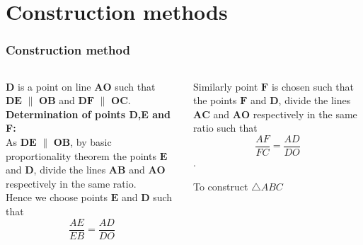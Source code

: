 \documentclass{beamer}
\renewcommand{\vec}[1]{\mathbf{#1}}
\begin{document}
\section*{Construction methods}
\begin{frame}[fragile]
\footnotesize
\frametitle{Construction method}
\begin{columns}
\begin{column}{0.5\textwidth}
    
    $\vec{D}$ is a point on line $\vec{AO}$ such that \\$\vec{DE}$ $\parallel$ $\vec{OB}$ \quad and \quad $\vec{DF}$  $\parallel$  $\vec{OC}$.\\

\textbf{Determination of points D,E and F:}\\

As $\vec{DE}$ $\parallel$ $\vec{OB}$, by basic proportionality theorem the points $\vec{E}$ and $\vec{D}$, divide the lines $\vec{AB}$ and $\vec{AO}$ respectively in the same ratio.\\ 
Hence we choose points $\vec{E}$ and $\vec{D}$ such that \begin{equation}\frac{AE}{EB} = \frac{AD}{DO}\end{equation} 

  \end{column}
 
 
\begin{column}{0.5\textwidth}   
\quad Similarly point $\vec{F}$ is chosen such that the points $\vec{F}$ and $\vec{D}$, divide the lines $\vec{AC}$ and $\vec{AO}$ respectively in the same ratio such that \begin{equation}\frac{AF}{FC} = \frac{AD}{DO}\end{equation}.\\
  

\begin{table}[ht]
    \begin{center}
    
    \caption{To construct $\triangle ABC$}
   \label{table:table2}
   \end{center}	
\end{table}

 
    
\end{column}
\end{columns}
\end{frame}
\end{document}
